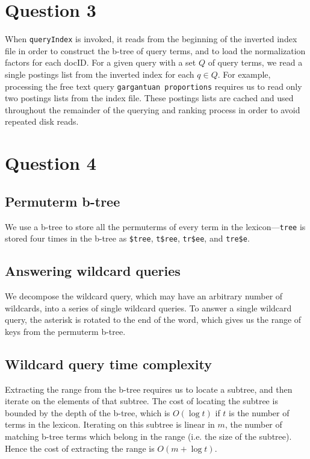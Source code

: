 \documentclass[11pt]{article}
\begin{document}
\section{Question 3}

When \texttt{queryIndex} is invoked, it reads from the beginning of the inverted index file in order
to construct the b-tree of query terms, and to load the normalization factors for each docID.
For a given query with a set $Q$ of query terms, we read a single postings list from the inverted
index for each $q \in Q$. For example, processing the free text query \texttt{gargantuan proportions}
requires us to read only two postings lists from the index file. These postings lists are cached and used throughout the remainder of the
querying and ranking process in order to avoid repeated disk reads.

\section{Question 4}

\subsection{Permuterm b-tree}

We use a b-tree to store all the permuterms of every term in the lexicon---\texttt{tree} is stored four times in the
b-tree as \texttt{\$tree}, \texttt{t\$ree}, \texttt{tr\$ee}, and \texttt{tre\$e}.

\subsection{Answering wildcard queries}

We decompose the wildcard query, which may
have an arbitrary number of wildcards, into a series of single wildcard queries. To answer a single
wildcard query, the asterisk is rotated to the end of the word, which gives us the range of keys from the permuterm b-tree.

\subsection{Wildcard query time complexity}

Extracting the range from the b-tree requires us to locate a subtree, and then iterate on the elements of that subtree. The cost of locating the subtree is bounded
by the depth of the b-tree, which is $O(\log t)$ if $t$ is the number of terms in the lexicon. Iterating
on this subtree is linear in $m$, the number of matching b-tree terms which belong
in the range (i.e. the size of the subtree). Hence the cost of extracting the range is $O(m + \log t)$.
\end{document}
